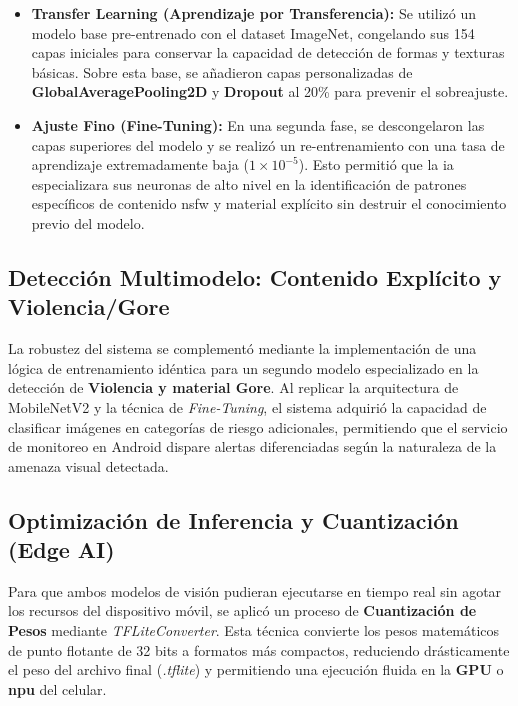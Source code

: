 \begin{itemize}
    \item \textbf{Transfer Learning (Aprendizaje por Transferencia):} Se utilizó un modelo base pre-entrenado con el dataset ImageNet, congelando sus 154 capas iniciales para conservar la capacidad de detección de formas y texturas básicas. Sobre esta base, se añadieron capas personalizadas de \textbf{GlobalAveragePooling2D} y \textbf{Dropout} al 20\% para prevenir el sobreajuste.
    \item \textbf{Ajuste Fino (Fine-Tuning):} En una segunda fase, se descongelaron las capas superiores del modelo y se realizó un re-entrenamiento con una tasa de aprendizaje extremadamente baja ($1 \times 10^{-5}$). Esto permitió que la \gls{ia} especializara sus neuronas de alto nivel en la identificación de patrones específicos de contenido \gls{nsfw} y material explícito sin destruir el conocimiento previo del modelo.
\end{itemize}

\subsection{Detección Multimodelo: Contenido Explícito y Violencia/Gore}
La robustez del sistema se complementó mediante la implementación de una lógica de entrenamiento idéntica para un segundo modelo especializado en la detección de \textbf{Violencia y material Gore}. Al replicar la arquitectura de MobileNetV2 y la técnica de \textit{Fine-Tuning}, el sistema adquirió la capacidad de clasificar imágenes en categorías de riesgo adicionales, permitiendo que el servicio de monitoreo en Android dispare alertas diferenciadas según la naturaleza de la amenaza visual detectada.

\subsection{Optimización de Inferencia y Cuantización (Edge AI)}
Para que ambos modelos de visión pudieran ejecutarse en tiempo real sin agotar los recursos del dispositivo móvil, se aplicó un proceso de \textbf{Cuantización de Pesos} mediante \textit{TFLiteConverter}. Esta técnica convierte los pesos matemáticos de punto flotante de 32 bits a formatos más compactos, reduciendo drásticamente el peso del archivo final (\textit{.tflite}) y permitiendo una ejecución fluida en la \textbf{GPU} o \textbf{\gls{npu}} del celular.\\\\

